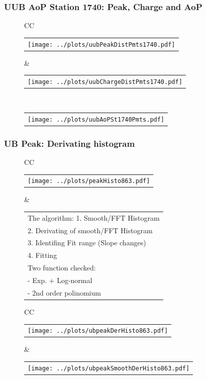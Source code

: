 \documentclass[aspectratio=169]{beamer}
\begin{document}

\begin{frame}
  \frametitle{UUB AoP Station 1740: Peak, Charge and AoP}
  \begin{figure}
    \centering
    \begin{tabularx}{\textwidth}{CC}
      \begin{tabular}{l}
        \texttt{[image: ../plots/uubPeakDistPmts1740.pdf]}
      \end{tabular}
      &
      \begin{tabular}{l}
        \texttt{[image: ../plots/uubChargeDistPmts1740.pdf]}
      \end{tabular}
      \\
      \begin{tabular}{l}
        \texttt{[image: ../plots/uubAoPSt1740Pmts.pdf]}
      \end{tabular}
    \end{tabularx}
  \end{figure}
\end{frame}




\begin{frame}
  \frametitle{UB Peak: Derivating histogram} %
  \begin{figure}
    \centering
    \begin{tabularx}{\textwidth}{CC}
      \begin{tabular}{l}
        \texttt{[image: ../plots/peakHisto863.pdf]}
      \end{tabular}
      &
      \footnotesize
      \begin{tabular}{l}
        The algorithm:
        1. Smooth/FFT Histogram \\
        2. Derivating of smooth/FFT Histogram \\
        3. Identifing Fit range (Slope changes) \\
        4. Fitting \\
        Two function checked: \\
        - Exp. + Log-normal \\
        - 2nd order polinomium
      \end{tabular}
    \end{tabularx}

    \begin{tabularx}{\textwidth}{CC}
      \begin{tabular}{l}
        \texttt{[image: ../plots/ubpeakDerHisto863.pdf]}
      \end{tabular}
      &
      \begin{tabular}{l}
        \texttt{[image: ../plots/ubpeakSmoothDerHisto863.pdf]}
      \end{tabular}
    \end{tabularx}
  \end{figure}
\end{frame}
\end{document}
